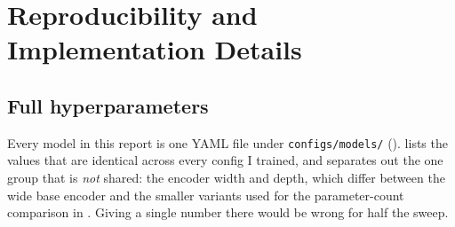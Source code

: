 %

\section{Reproducibility and Implementation Details}
\label{app:repro}

\subsection{Full hyperparameters}
\label{app:hparams}

Every model in this report is one YAML file under \texttt{configs/models/}
().  lists the values that are identical across every
config I trained, and separates out the one group that is \emph{not} shared: the encoder width and
depth, which differ between the wide base encoder and the smaller variants used for the
parameter-count comparison in . Giving a single number there would be wrong for half
the sweep.

